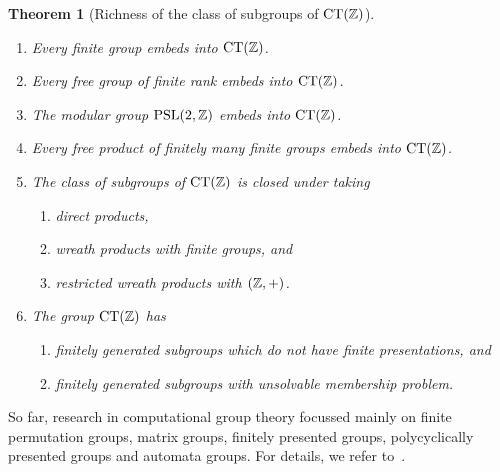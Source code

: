 \documentclass{amsart}
\theoremstyle{definition} \newtheorem{CTZDefinition}{Definition}[section]
\theoremstyle{plain}      \newtheorem{CTZPropertiesTheorem}[CTZDefinition]{Theorem}
\theoremstyle{plain}      \newtheorem{CTZSubgroupsTheorem}[CTZDefinition]{Theorem}
\theoremstyle{definition} \newtheorem{RcwaMappingDefinition}{Definition}[section]
\theoremstyle{definition} \newtheorem{RCWADefinition}[RcwaMappingDefinition]{Definition}
\theoremstyle{plain}      \newtheorem{CTZNotFinitelyGeneratedTheorem}
\theoremstyle{definition} \newtheorem{CTZSmEmbeddingDefinition}[RcwaMappingDefinition]{Definition}
\theoremstyle{plain}      \newtheorem{CTZHighlyTransitiveTheorem}[RcwaMappingDefinition]{Theorem}
\theoremstyle{plain}      \newtheorem{CTZTorsionElementsDivisibleTheorem}
\theoremstyle{plain}      \newtheorem{CTLemma}{Lemma}[section]
\theoremstyle{plain}      \newtheorem{IntegralCommutatorLemma}[CTLemma]{Lemma}
\theoremstyle{plain}      \newtheorem{NormalSubgroupContainsIntegralElementLemma}[CTLemma]{Lemma}
\theoremstyle{plain}      \newtheorem{CTZSimpleTheorem}[CTLemma]{Theorem}
\theoremstyle{remark}     \newtheorem{CTZSimpleRemark}[CTLemma]{Remark}
\theoremstyle{definition} \newtheorem{CTPZDefinition}[CTLemma]{Definition}
\theoremstyle{plain}      \newtheorem{CTPZSimpleCorollary}[CTLemma]{Corollary}
\theoremstyle{plain}      \newtheorem{CTPZSimpleProblem}[CTLemma]{Problem}
\theoremstyle{plain}      \newtheorem{FnPSL2ZEmbeddingTheorem}{Theorem}[section]
\theoremstyle{plain}      \newtheorem{FreeProductEmbeddingTheorem}[FnPSL2ZEmbeddingTheorem]{Theorem}
\theoremstyle{definition} \newtheorem{RestrictionMonomorphismDefinition}
\theoremstyle{plain}      \newtheorem{DirectAndWreathProductsEmbeddingTheorem}
\theoremstyle{plain}      \newtheorem{DirectAndWreathProductsEmbeddingCorollary}
\theoremstyle{definition} \newtheorem{CTintZDefinition}[FnPSL2ZEmbeddingTheorem]{Definition}
\theoremstyle{plain}      \newtheorem{CTintZSimpleTheorem}[FnPSL2ZEmbeddingTheorem]{Theorem}
\theoremstyle{definition} \newtheorem{KernelDefinition}{Definition}[section]
\theoremstyle{definition} \newtheorem{TameWildDefinition}[KernelDefinition]{Definition}
\theoremstyle{definition} \newtheorem{SimpleSupergroupsDefinition}[KernelDefinition]{Definition}
\theoremstyle{definition} \newtheorem{CSCRDefinition}[KernelDefinition]{Definition}
\theoremstyle{plain}      \newtheorem{SimpleSupergroupsGeneratorsTheorem}[KernelDefinition]{Theorem}
\theoremstyle{plain}      \newtheorem{SimpleSupergroupsTheorem}[KernelDefinition]{Theorem}
\theoremstyle{plain}      \newtheorem{SimpleSupergroupsTransitivityTheorem}
\theoremstyle{plain}      \newtheorem{TameGenerationConjecture}[KernelDefinition]{Conjecture}
\theoremstyle{remark}     \newtheorem{TameGenerationRemark}[KernelDefinition]{Remark}
\begin{document}
\begin{CTZSubgroupsTheorem}[Richness of the class of subgroups of \(\CT{\ZZ}\)]
\label{CTZSubgroupsTheorem}
  \verb| |
  \begin{enumerate}

    \item Every finite group embeds into \(\CT{\ZZ}\).

    \item Every free group of finite rank embeds into \(\CT{\ZZ}\).

    \item The modular group \(\PSL{2}{\ZZ}\) embeds into \(\CT{\ZZ}\).

    \item Every free product of finitely many finite groups embeds into \(\CT{\ZZ}\).

    \item The class of subgroups of \(\CT{\ZZ}\) is closed under taking
          \begin{enumerate}

            \item direct products,

            \item wreath products with finite groups, and

            \item restricted wreath products with \((\mathbb{Z},+)\).

          \end{enumerate}

    \item The group \(\CT{\ZZ}\) has
          \begin{enumerate}

            \item finitely generated subgroups which do not have finite presentations, and

            \item finitely generated subgroups with unsolvable membership problem.

          \end{enumerate}

  \end{enumerate}
\end{CTZSubgroupsTheorem}

So far, research in computational group theory focussed mainly on finite
permutation groups, matrix groups, finitely presented groups, polycyclically presented groups
and automata groups. For details, we refer to~\cite{HoltEickOBrien05}.
\end{document}

